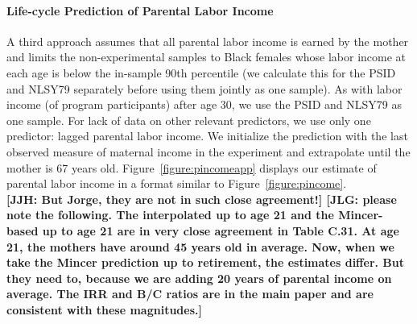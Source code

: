 \paragraph{Life-cycle Prediction of Parental Labor Income} \label{appendix:lcyclepincome}

\noindent A third approach assumes that all parental labor income is earned by the mother and limits the non-experimental samples to Black females whose labor income at each age is below the in-sample 90th percentile (we calculate this for the PSID and NLSY79 separately before using them jointly as one sample). As with labor income (of program participants) after age 30, we use the PSID and NLSY79 as one sample. For lack of data on other relevant predictors, we use only one predictor: lagged parental labor income. We initialize the prediction with the last observed measure of maternal income in the experiment and extrapolate until the mother is 67 years old. Figure~\ref{figure:pincomeapp} displays our estimate of parental labor income in a format similar to Figure~\ref{figure:pincome}.\\

\textbf{[JJH: But Jorge, they are not in such close agreement!] [JLG: please note the following. The interpolated up to age 21 and the Mincer-based up to age 21 are in very close agreement in Table C.31. At age 21, the mothers have around 45 years old in average. Now, when we take the Mincer prediction up to retirement, the estimates differ. But they need to, because we are adding 20 years of parental income on average. The IRR and B/C ratios are in the main paper and are consistent with these magnitudes.]}

